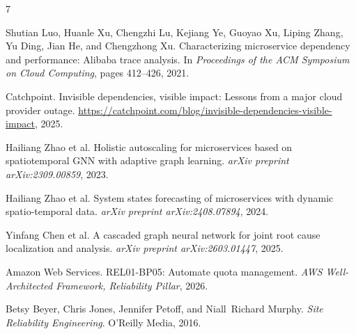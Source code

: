 \documentclass{article}
\begin{document}

\begin{thebibliography}{7}

Shutian Luo, Huanle Xu, Chengzhi Lu, Kejiang Ye, Guoyao Xu, Liping Zhang, Yu Ding, Jian He, and Chengzhong Xu.
\newblock Characterizing microservice dependency and performance: Alibaba trace analysis.
\newblock In \emph{Proceedings of the ACM Symposium on Cloud Computing}, pages 412--426, 2021.

Catchpoint.
\newblock Invisible dependencies, visible impact: Lessons from a major cloud provider outage.
\newblock \url{https://catchpoint.com/blog/invisible-dependencies-visible-impact}, 2025.

Hailiang Zhao et al.
\newblock Holistic autoscaling for microservices based on spatiotemporal GNN with adaptive graph learning.
\newblock \emph{arXiv preprint arXiv:2309.00859}, 2023.

Hailiang Zhao et al.
\newblock System states forecasting of microservices with dynamic spatio-temporal data.
\newblock \emph{arXiv preprint arXiv:2408.07894}, 2024.

Yinfang Chen et al.
\newblock A cascaded graph neural network for joint root cause localization and analysis.
\newblock \emph{arXiv preprint arXiv:2603.01447}, 2025.

Amazon Web Services.
\newblock REL01-BP05: Automate quota management.
\newblock \emph{AWS Well-Architected Framework, Reliability Pillar}, 2026.

Betsy Beyer, Chris Jones, Jennifer Petoff, and Niall~Richard Murphy.
\newblock \emph{Site Reliability Engineering}.
\newblock O'Reilly Media, 2016.

\end{thebibliography}
\end{document}
